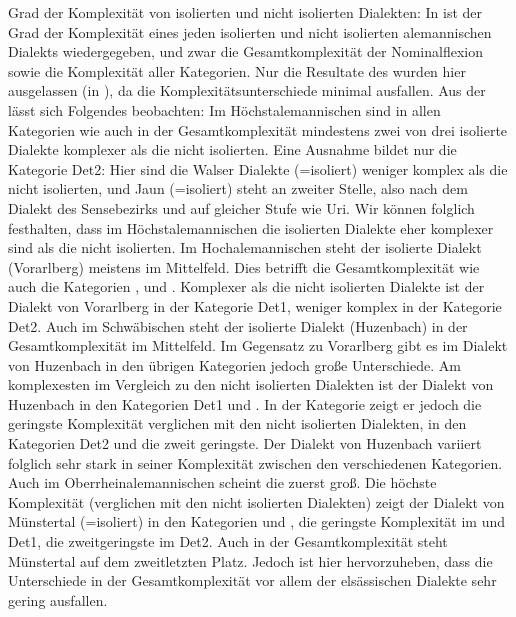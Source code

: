 {Grad der Komplexität von isolierten und nicht isolierten Dialekten:} In  ist der Grad der Komplexität eines jeden isolierten und nicht isolierten alemannischen Dialekts wiedergegeben, und zwar die Gesamtkomplexität der Nominalflexion sowie die Komplexität aller Kategorien. Nur die Resultate des  wurden hier ausgelassen (in ), da die Komplexitätsunterschiede minimal ausfallen. Aus der  lässt sich Folgendes beobachten: Im Höchstalemannischen sind in allen Kategorien wie auch in der Gesamtkomplexität mindestens zwei von drei isolierte Dialekte komplexer als die nicht isolierten. Eine Ausnahme bildet nur die Kategorie Det2: Hier sind die Walser Dialekte (=isoliert) weniger komplex als die nicht isolierten, und Jaun (=isoliert) steht an zweiter Stelle, also nach dem Dialekt des Sensebezirks und auf gleicher Stufe wie Uri. Wir können folglich festhalten, dass im Höchstalemannischen die isolierten Dialekte eher komplexer sind als die nicht isolierten. Im Hochalemannischen steht der isolierte Dialekt (Vorarlberg) meistens im Mittelfeld. Dies betrifft die Gesamtkomplexität wie auch die Kategorien ,  und . Komplexer als die nicht isolierten Dialekte ist der Dialekt von Vorarlberg in der Kategorie Det1, weniger komplex in der Kategorie Det2. Auch im Schwäbischen steht der isolierte Dialekt (Huzenbach) in der Gesamtkomplexität im Mittelfeld. Im Gegensatz zu Vorarlberg gibt es im Dialekt von Huzenbach in den übrigen Kategorien jedoch große Unterschiede. Am komplexesten im Vergleich zu den nicht isolierten Dialekten ist der Dialekt von Huzenbach in den Kategorien Det1 und . In der Kategorie  zeigt er jedoch die geringste Komplexität verglichen mit den nicht isolierten Dialekten, in den Kategorien Det2 und  die zweit geringste. Der Dialekt von Huzenbach variiert folglich sehr stark in seiner Komplexität zwischen den verschiedenen Kategorien. Auch im Oberrheinalemannischen scheint die  zuerst groß. Die höchste Komplexität (verglichen mit den nicht isolierten Dialekten) zeigt der Dialekt von Münstertal (=isoliert) in den Kategorien  und , die geringste Komplexität im  und Det1, die zweitgeringste im Det2. Auch in der Gesamtkomplexität steht Münstertal auf dem zweitletzten Platz. Jedoch ist hier hervorzuheben, dass die Unterschiede in der Gesamtkomplexität vor allem der elsässischen Dialekte sehr gering ausfallen.


